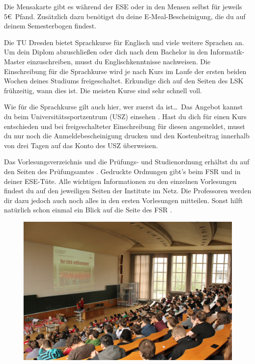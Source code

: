 \begin{itemize}[leftmargin=*]
Die Mensakarte gibt es während der ESE oder in den Mensen selbst für jeweils 5\euro\ Pfand.
Zusätzlich dazu benötigst du deine E-Meal-Bescheinigung, die du auf deinem Semesterbogen findest.

\newpage

Die TU Dresden bietet Sprachkurse für Englisch und viele weitere Sprachen an. Um dein Diplom abzuschließen oder dich nach dem Bachelor in den Informatik-Master einzuschreiben, musst du Englischkenntnisse nachweisen. Die Einschreibung für die Sprachkurse wird je nach Kurs im Laufe der ersten beiden Wochen deines Studiums freigeschaltet.
Erkundige dich auf den Seiten des LSK  frühzeitig, wann dies ist. Die meisten Kurse sind sehr schnell voll.

Wie für die Sprachkurse gilt auch hier, wer zuerst da ist\ldots~Das Angebot kannst du beim Universitätssportzentrum (USZ) einsehen .
Hast du dich für einen Kurs entschieden und bei freigeschalteter Einschreibung für diesen angemeldet, musst du nur noch die Anmeldebescheinigung drucken und den Kostenbeitrag innerhalb von drei Tagen auf das Konto des USZ überweisen.

Das Vorlesungsverzeichnis und die Prüfungs- und Studienordnung erhältst du auf den Seiten des Prüfungsamtes .
Gedruckte Ordnungen gibt's beim FSR und in deiner ESE-Tüte.
Alle wichtigen Informationen zu den einzelnen Vorlesungen findest du auf den jeweiligen Seiten der Institute im Netz.
Die Professoren werden dir dazu jedoch auch noch alles in den ersten Vorlesungen mitteilen. Sonst hilft natürlich schon einmal ein Blick auf die Seite des FSR .

\vfill

\begin{figure}[h!]
\centering
\includegraphics[width=0.9\linewidth]{img/ese2013/barschoe.jpg}
\end{figure}


\end{itemize}
